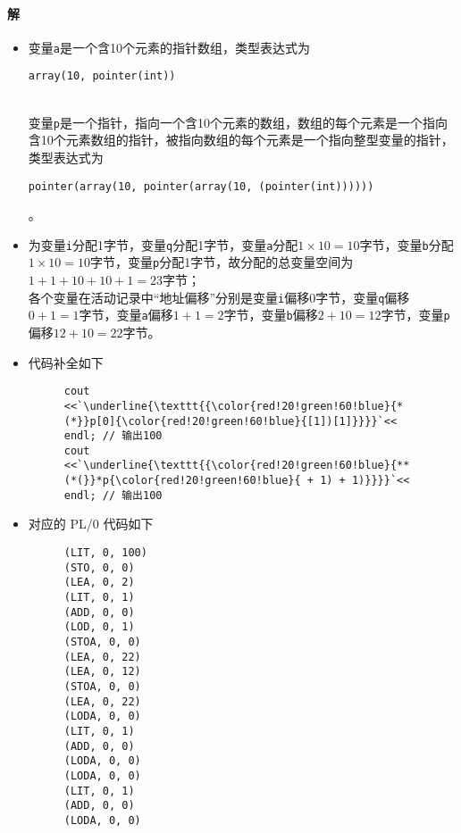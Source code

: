 \documentclass{article}
\begin{document}
\paragraph{解}
\begin{itemize}
    \item 变量\texttt{a}是一个含10个元素的指针数组，类型表达式为\\
    \centerline{\lstinline{array(10, pointer(int))}}\\
    变量\texttt{p}是一个指针，指向一个含10个元素的数组，数组的每个元素是一个指向含10个元素数组的指针，被指向数组的每个元素是一个指向整型变量的指针，类型表达式为\\
    \centerline{\lstinline{pointer(array(10, pointer(array(10, (pointer(int))))))}}。
    \item 为变量\texttt{i}分配1字节，变量\texttt{q}分配1字节，变量\texttt{a}分配$1 \times 10 = 10$字节，变量\texttt{b}分配$1 \times 10 = 10$字节，变量\texttt{p}分配1字节，故分配的总变量空间为$1 + 1 + 10 + 10 + 1 = 23$字节；\\
    各个变量在活动记录中“地址偏移”分别是变量\texttt{i}偏移0字节，变量\texttt{q}偏移$0 + 1 = 1$字节，变量\texttt{a}偏移$1 + 1 = 2$字节，变量\texttt{b}偏移$2 + 10 = 12$字节，变量\texttt{p}偏移$12 + 10 = 22$字节。
    \item 代码补全如下
    \begin{figure}[H]
        \begin{lstlisting}[style = C++, frame = single]
cout <<`\underline{\texttt{{\color{red!20!green!60!blue}{*(*}}p[0]{\color{red!20!green!60!blue}{[1])[1]}}}}`<< endl; // 输出100
cout <<`\underline{\texttt{{\color{red!20!green!60!blue}{**(*(}}*p{\color{red!20!green!60!blue}{ + 1) + 1)}}}}`<< endl; // 输出100
        \end{lstlisting}
    \end{figure}
    \item 对应的 PL/0 代码如下
    \begin{figure}[H]
    \begin{lstlisting}[language =  PL/I, alsolanguage = C, frame = single]
(LIT, 0, 100)
(STO, 0, 0)
(LEA, 0, 2)
(LIT, 0, 1)
(ADD, 0, 0)
(LOD, 0, 1)
(STOA, 0, 0)
(LEA, 0, 22)
(LEA, 0, 12)
(STOA, 0, 0)
(LEA, 0, 22)
(LODA, 0, 0)
(LIT, 0, 1)
(ADD, 0, 0)
(LODA, 0, 0)
(LODA, 0, 0)
(LIT, 0, 1)
(ADD, 0, 0)
(LODA, 0, 0)
    \end{lstlisting}
\end{figure}
\end{itemize}
\end{document}
